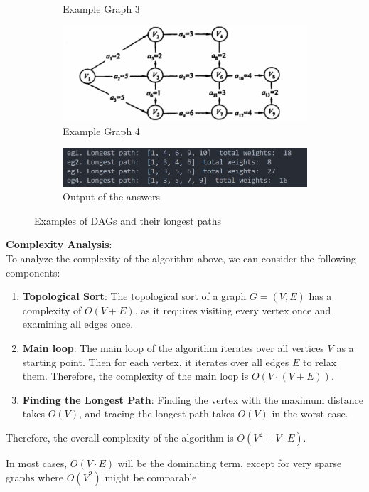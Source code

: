 \documentclass[UTF8]{ctexart}
\begin{document}
\begin{figure}[htbp]
\begin{subfigure}{0.3\textwidth}
      \caption{Example Graph 3}
  \end{subfigure}%
  \vspace{0.5cm}
  \begin{subfigure}{0.5\textwidth}
    \centering
    \includegraphics[width=0.8\linewidth]{example4.png}
    \caption{Example Graph 4}
  \end{subfigure}%
\begin{subfigure}{0.5\textwidth}
  \centering
  \includegraphics[width=\linewidth]{eganswer.png}
  \caption{Output of the answers}
  \end{subfigure}%
  \caption{Examples of DAGs and their longest paths}
  \label{fig:examples}
\end{figure}

\textbf{\large Complexity Analysis}:\\
To analyze the complexity of the algorithm above, we can consider the following components:

\begin{enumerate}
    \item \textbf{Topological Sort}: The topological sort of a graph \( G = (V, E) \) has a complexity of \( O(V + E) \), as it requires visiting every vertex once and examining all edges once.

    \item \textbf{Main loop}: The main loop of the algorithm iterates over all vertices \( V \) as a starting point. Then for each vertex, it iterates over all edges \( E \) to relax them. Therefore, the complexity of the main loop is \( O(V \cdot (V+E)) \).

    \item \textbf{Finding the Longest Path}: Finding the vertex with the maximum distance takes \( O(V) \), and tracing the longest path takes \( O(V) \) in the worst case.
\end{enumerate}

Therefore, the overall complexity of the algorithm is \( O(V^2+V \cdot E) \).

In most cases, \( O(V \cdot E) \) will be the dominating term, except for very sparse graphs where \( O(V^2) \) might be comparable.\\ 
\end{document}
